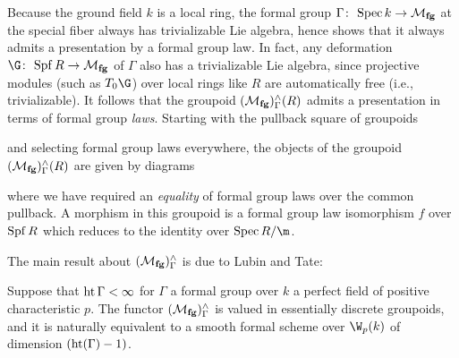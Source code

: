 \begin{remark}\label{LubinTateStackInFGLTerms}
Because the ground field \(k\) is a local ring, the formal group \(\Gamma\colon\thinspace \operatorname{Spec} k \to \mathcal{M}_{\mathbf{fg}}\) at the special fiber always has trivializable Lie algebra, hence  shows that it always admits a presentation by a formal group law.  In fact, any deformation \(\G\co \Spf R \to \moduli{fg}\) of \(\Gamma\) also has a trivializable Lie algebra, since projective modules (such as \(T_0 \G\)) over local rings like \(R\) are automatically free (i.e., trivializable).  It follows that the groupoid \((\mathcal{M}_{\mathbf{fg}})^\wedge_\Gamma(R)\) admits a presentation in terms of formal group \emph{laws}.  Starting with the pullback square of groupoids
\begin{center}
\end{center}
and selecting formal group laws everywhere, the objects of the groupoid \((\mathcal{M}_{\mathbf{fg}})^\wedge_\Gamma(R)\) are given by diagrams
\begin{center}
\end{center}
where we have required an \emph{equality} of formal group laws over the common pullback.  A morphism in this groupoid is a formal group law isomorphism \(f\) over \(\operatorname{Spf} R\) which reduces to the identity over \(\Spec R/\m\).
\end{remark}

The main result about \((\mathcal{M}_{\mathbf{fg}})^\wedge_\Gamma\) is due to Lubin and Tate:
\begin{theorem}\label{LubinTateModuliThm}
Suppose that \(\operatorname{ht} \Gamma < \infty\) for \(\Gamma\) a formal group over \(k\) a perfect field of positive characteristic \(p\).  The functor \((\mathcal{M}_{\mathbf{fg}})^\wedge_\Gamma\) is valued in essentially discrete groupoids, and it is naturally equivalent to a smooth formal scheme over \(\W_p(k)\) of dimension \((\operatorname{ht}(\Gamma) - 1)\).
\end{theorem}

